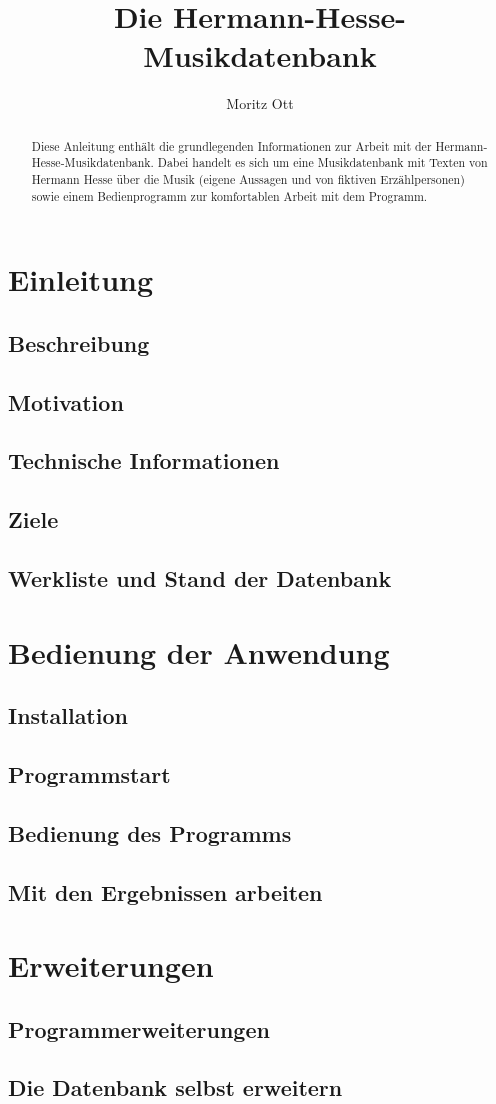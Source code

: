 \documentclass[oneside, a4paper]{article}
\author{Moritz Ott}
\title{Die Hermann-Hesse-Musikdatenbank}
\begin{document}
\maketitle
\thispagestyle{empty}
\newpage
\tableofcontents
\newpage
\begin{abstract}
Diese Anleitung enthält die grundlegenden Informationen zur Arbeit mit der Hermann-Hesse-Musikdatenbank. Dabei handelt es sich um eine Musikdatenbank mit Texten von Hermann Hesse über die Musik (eigene Aussagen und von fiktiven Erzählpersonen)
sowie einem Bedienprogramm zur komfortablen Arbeit mit dem Programm.
\end{abstract}
\newpage
\section{Einleitung}

\subsection{Beschreibung}
\blindtext

\subsection{Motivation}
\blindtext
\subsection{Technische Informationen}
\blindtext
\subsection{Ziele}
\blindtext
\subsection{Werkliste und Stand der Datenbank}
\blindtext\blindtext\blindtext
\section{Bedienung der Anwendung}
\blindtext\blindtext
\subsection{Installation}
\blindtext
\subsection{Programmstart}
\blindtext\blindtext
\subsection{Bedienung des Programms}
\blindtext
\subsection{Mit den Ergebnissen arbeiten}
\blindtext
\section{Erweiterungen}
\subsection{Programmerweiterungen}
\subsection{Die Datenbank selbst erweitern}
\blindtext
\end{document}
